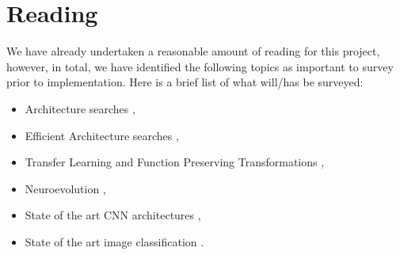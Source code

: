 \documentclass[10pt,letterpaper]{article}
\begin{document}
\section{Reading}
We have already undertaken a reasonable amount of reading for this project, however, in total, we have identified the following topics as important to survey prior to implementation. Here is a brief list of what will/has be surveyed: 
\begin{itemize}
	\item Architecture searches \cite{as2, as1, as3},
    \item Efficient Architecture searches \cite{eas1, eas2},
    \item Transfer Learning and Function Preserving Transformations \cite{net2net, transfer1},
    \item Neuroevolution \cite{ne3, as2, ne1, ne2, shimonsarl},
    \item State of the art CNN architectures \cite{densenet,inception3,resnet3},
    \item State of the art image classification \cite{classify3, classify4, classify2, resnet3, classify6, as1}.
\end{itemize}


{\small


}
\end{document}
